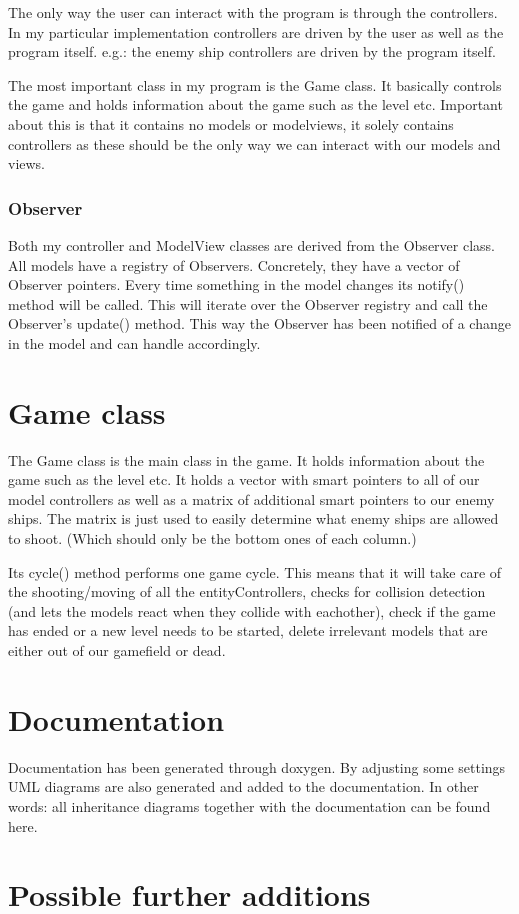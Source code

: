 \documentclass[11pt, a4paper]{article}
\begin{document}
The only way the user can interact with the program is through the controllers.
In my particular implementation controllers are driven by the user as well as the program itself. e.g.: the enemy ship controllers are driven by the program itself.

The most important class in my program is the Game class. It basically controls the game and holds information about the game such as the level etc.
Important about this is that it contains no models or modelviews, it solely contains controllers as these should be the only way we can interact with our models and views.

\subsubsection{Observer}
Both my controller and ModelView classes are derived from the Observer class.
All models have a registry of Observers. Concretely, they have a vector of Observer pointers.
Every time something in the model changes its notify() method will be called. This will iterate over the Observer registry and call the Observer's update() method.
This way the Observer has been notified of a change in the model and can handle accordingly.

\section{Game class}
The Game class is the main class in the game. It holds information about the game such as the level etc.
It holds a vector with smart pointers to all of our model controllers as well as a matrix of additional smart pointers to our enemy ships. The matrix is just used to easily determine what enemy ships are allowed to shoot.
(Which should only be the bottom ones of each column.)

Its cycle() method performs one game cycle. This means that it will take care of the shooting/moving of all the entityControllers, checks for collision detection (and lets the models react when they collide with eachother),
check if the game has ended or a new level needs to be started, delete irrelevant models that are either out of our gamefield or dead.

\section{Documentation}
Documentation has been generated through doxygen. By adjusting some settings UML diagrams are also generated and added to the documentation.
In other words: all inheritance diagrams together with the documentation can be found here.


\section{Possible further additions}
\end{document}

